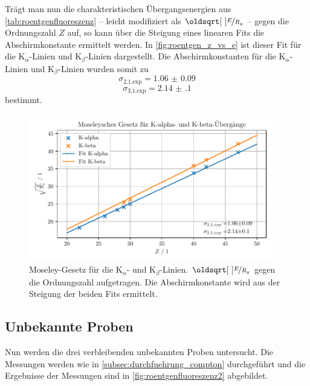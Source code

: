 \documentclass[ngerman]{scrartcl}
\begin{document}
%
Trägt man nun die charakteristischen Übergangsenergien aus \autoref{tab:roentgenfluoreszenz} -- leicht modifiziert als $\sqrt{\nicefrac{E}{R_y}}$ -- gegen die Ordnungszahl $Z$ auf, so kann über die Steigung eines linearen Fits die Abschirmkonstante ermittelt werden. In \autoref{fig:roentgen_z_vs_e} ist dieser Fit für die K$_{\alpha}$-Linien und K$_{\beta}$-Linien dargestellt. Die Abschirmkonstanten für die K$_{\alpha}$-Linien und K$_{\beta}$-Linien wurden somit zu
\[\sigma_{\text{2,1,exp}} = \num{1.06(9)} \]
\[\sigma_{\text{3,1,exp}} = \num{2.14(10)}\]
bestimmt.
%
\begin{figure}[H]
    \centering
    \begin{samepage}
        \includegraphics[width=0.95\textwidth]{../plots/roentgen_data_Z_vs_E.pdf}
        \caption[Mosley-Gesetz für die K$_{\alpha}$- und K$_{\beta}$-Linien.]{Moseley-Gesetz für die K$_{\alpha}$- und K$_{\beta}$-Linien. $\sqrt{\nicefrac{E}{R_y}}$ gegen die Ordnungszahl aufgetragen. Die Abschirmkonstante wird aus der Steigung der beiden Fits ermittelt.}
        \label{fig:roentgen_z_vs_e}
    \end{samepage}
\end{figure}


\subsection{Unbekannte Proben}
\label{sec:roentgen_unbekannt}

Nun werden die drei verbleibenden unbekannten Proben untersucht. Die Messungen werden wie in \autoref{subsec:durchfuehrung_compton} durchgeführt und die Ergebnisse der Messungen sind in \autoref{fig:roentgenfluoreszenz2} abgebildet.
\end{document}
